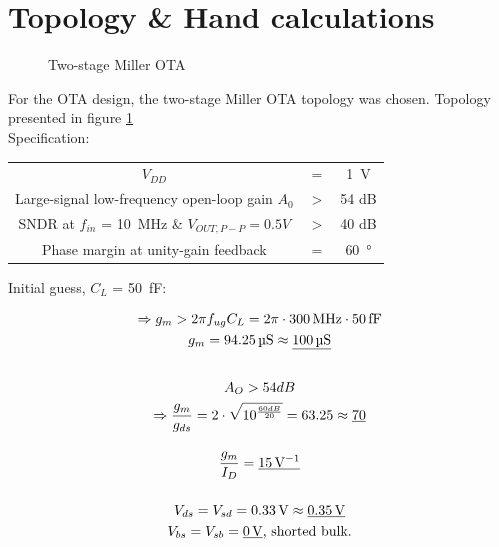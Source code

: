 \section{Topology \& Hand calculations}
\begin{figure}[H]
    \centering
    \caption{Two-stage Miller OTA}
    \label{fig:miller:cirk}
\end{figure}
For the OTA design, the two-stage Miller OTA topology was chosen. Topology presented in figure \ref{fig:miller:cirk}\\

Specification:\\
\begin{table}[!htbp]
    \centering
    \begin{tabular}{c c c}
        $V_{DD}$ & = & \SI{1}{\volt}\\
        Large-signal low-frequency open-loop gain $A_{0}$ & $>$ & 54 dB\\
        SNDR at $f_{in}$ = \SI{10}{\mega\hertz} \& $V_{OUT,P-P} = 0.5V$ & $>$ & 40 dB\\
        Phase margin at unity-gain feedback & = & \SI{60}{\degree}
    \end{tabular}
\end{table}


Initial guess, $C_{L}$ = \SI{50}{\femto\farad}:

\begin{gather*}
    \Rightarrow g_m > 2\pi f_{ug} C_L = 2\pi \cdot \SI{300}{\mega\hertz} \cdot \SI{50}{\femto\farad}\\
    g_{m} = \SI{94.25}{\micro\siemens} \approx \underline{\SI{100}{\micro\siemens}}\\
    \intertext{ }
    A_{O} > 54 dB\\
    \Rightarrow \frac{g_{m}}{g_{ds}} = 2 \cdot \sqrt{10^{\frac{60 dB}{20}}} = 63.25 \approx \underline{70}\\
    \intertext{ }
    \frac{g_{m}}{I_{D}}=\underline{\SI{15}{{\volt}^{-1}}}\\
    \intertext{}
    V_{ds} = V_{sd} = \SI{0.33}{\volt} \approx \underline{\SI{0.35}{\volt}}\\
    V_{bs} = V_{sb} = \underline{\SI{0}{\volt}}  \text{, shorted bulk.}\\
\end{gather*}


